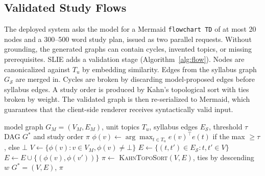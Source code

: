 \documentclass[conference]{IEEEtran}
\begin{document}
\subsection{Validated Study Flows}
The deployed system asks the model for a Mermaid \texttt{flowchart TD} of at
most 20 nodes and a 300--500 word study plan, issued as two parallel
requests. Without grounding, the generated graphs can contain cycles,
invented topics, or missing prerequisites. SLIE adds a validation stage
(Algorithm~\ref{alg:flow}). Nodes are canonicalized against $T_u$ by
embedding similarity. Edges from the syllabus graph $G_{\mathcal{S}}$ are
merged in. Cycles are broken by discarding model-proposed edges before
syllabus edges. A study order is produced by Kahn's topological sort with
ties broken by weight. The validated graph is then re-serialized to Mermaid,
which guarantees that the client-side renderer receives syntactically valid
input.

\begin{algorithm}[t]
\caption{Syllabus-Validated Study-Flow Construction}
\label{alg:flow}
\begin{algorithmic}[1]
\REQUIRE model graph $G_M=(V_M,E_M)$, unit topics $T_u$, syllabus edges $E_{\mathcal{S}}$, threshold $\tau$
\ENSURE DAG $G^\ast$ and study order $\pi$
\STATE $\phi(v) \leftarrow \arg\max_{t \in T_u} e(v)^\top e(t)$ if the max $\ge \tau$, else $\bot$
\STATE $V \leftarrow \{\phi(v) : v \in V_M, \phi(v)\neq\bot\}$
\STATE $E \leftarrow \{(t,t') \in E_{\mathcal{S}} : t,t' \in V\}$ 
    \STATE $E \leftarrow E \cup \{(\phi(v),\phi(v'))\}$
  \ENDIF
\ENDFOR
\STATE $\pi \leftarrow$ \textsc{KahnTopoSort}$(V,E)$, ties by descending $w$
\RETURN $G^\ast=(V,E)$, $\pi$
\end{algorithmic}
\end{algorithm}
\end{document}
